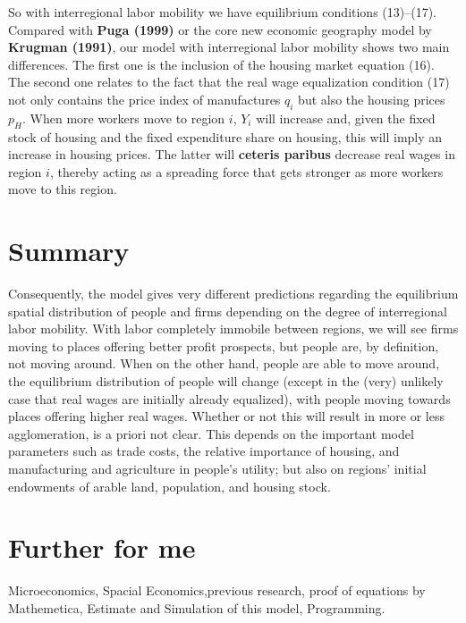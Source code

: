 \documentclass[twocolumn]{article}
\begin{document}
So with interregional labor mobility we have equilibrium conditions (13)–(17). Compared with \textbf{Puga (1999)} or the core new economic geography model by \textbf{Krugman (1991)}, our model with interregional labor mobility shows two main differences. The first one is the inclusion of the housing market equation (16). The second one relates to the fact that the real wage equalization condition (17) not only contains the price index of manufactures $q_i$ but also the housing prices $p_H$. When more workers move to region $i$, $Y_i$ will increase and, given the fixed stock of housing and the fixed expenditure share on housing, this will imply an increase in housing prices. The latter will \textbf{ceteris paribus} decrease real wages in region $i$, thereby acting as a spreading force that gets stronger as more workers move to this region.

\section{Summary}
Consequently, the model gives very different predictions regarding the equilibrium spatial distribution of people and firms depending on the degree of interregional labor mobility. With labor completely immobile between regions, we will see firms moving to places offering better profit prospects, but people are, by definition, not moving around. When on the other hand, people are able to move around, the equilibrium distribution of people will change (except in the (very) unlikely case that real wages are initially already equalized), with people moving towards places offering higher real wages. Whether or not this will result in more or less agglomeration, is a priori not clear. This depends on the important model parameters such as trade costs, the relative importance of housing, and manufacturing and agriculture in people’s utility; but also on regions’ initial endowments of arable land, population, and housing stock.

\section{Further for me}
Microeconomics, Spacial Economics,previous research, proof of equations by Mathemetica, Estimate and Simulation of this model, Programming.
\end{document}
